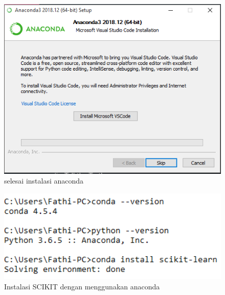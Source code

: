 \begin{enumerate}
\begin{figure}
\centerline{\includegraphics[width=1\textwidth]{figures/fathi/9.PNG}}
\caption{selesai instalasi anaconda}
\label{proses9}
\end{figure}
\begin{figure}
\centerline{\includegraphics[width=1\textwidth]{figures/fathi/10.PNG}}
\caption{Instalasi SCIKIT dengan menggunakan anaconda}
\label{proses10}


\end{figure}
\end{enumerate}
